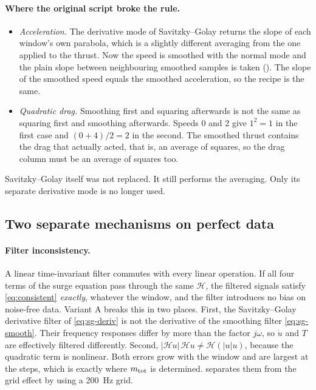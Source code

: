 \begin{revised}[title={Added 16 October 2026},breakable]
\paragraph{Where the original script broke the rule.}
\begin{itemize}
  \item \emph{Acceleration.} The derivative mode of Savitzky--Golay returns the slope of each
        window's own parabola, which is a slightly different averaging from the one applied to the
        thrust. Now the speed is smoothed with the normal mode and the plain slope between
        neighbouring smoothed samples is taken (). The slope of the smoothed
        speed equals the smoothed acceleration, so the recipe is the same.
  \item \emph{Quadratic drag.} Smoothing first and squaring afterwards is not the same as squaring
        first and smoothing afterwards. Speeds 0 and 2 give $1^2 = 1$ in the first case and
        $(0+4)/2 = 2$ in the second. The smoothed thrust contains the drag that actually acted,
        that is, an average of squares, so the drag column must be an average of squares too.
\end{itemize}
Savitzky--Golay itself was not replaced. It still performs the averaging. Only its separate
derivative mode is no longer used.
\end{revised}

\subsection{Two separate mechanisms on perfect data}

\paragraph{Filter inconsistency.} A linear time-invariant filter commutes with every linear
operation. If all four terms of the surge equation pass through the same $\mathcal{H}$, the
filtered signals satisfy \eqref{eq:consistent} \emph{exactly}, whatever the window, and the
filter introduces no bias on noise-free data. Variant A breaks this in two places. First, the
Savitzky--Golay derivative filter of \eqref{eq:sg-deriv} is not the derivative of the smoothing
filter \eqref{eq:sg-smooth}. Their frequency responses differ by more than the factor $j\omega$,
so $\dot u$ and $T$ are effectively filtered differently. Second, $|\mathcal{H}u|\,\mathcal{H}u
\neq \mathcal{H}(|u|u)$, because the quadratic term is nonlinear. Both errors grow with the
window and are largest at the steps, which is exactly where $m_\mathrm{tot}$ is determined.
 separates them from the grid effect by using a \qty{200}{\hertz} grid.

